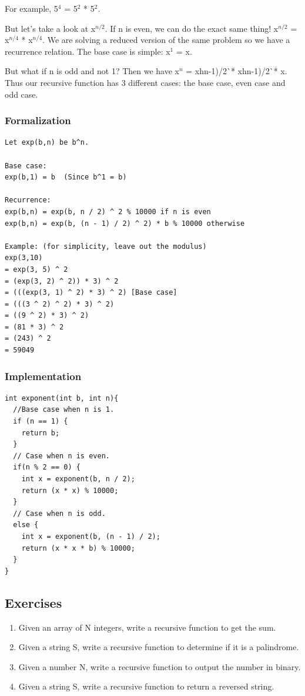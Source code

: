 \documentclass[11pt,oneside]{book}
\begin{document}
For example, 5$^{4}$ = 5$^{2}$ * 5$^{2}$.

But let's take a look at x$^{n/2}$. If n is even, we can do the exact same thing! x$^{n/2}$ = x$^{n/4}$ * x$^{n/4}$. We are solving a reduced version of the same problem so we have a recurrence relation. The base case is simple: x$^{1}$ = x.

But what if n is odd and not 1? Then we have x$^{n}$ = x^^(n-1)/2^^ * x^^(n-1)/2^^ * x. Thus our recursive function has 3 different cases: the base case, even case and odd case.

\subsubsection{Formalization}

\begin{lstlisting}
Let exp(b,n) be b^n.

Base case:
exp(b,1) = b  (Since b^1 = b)

Recurrence:
exp(b,n) = exp(b, n / 2) ^ 2 % 10000 if n is even
exp(b,n) = exp(b, (n - 1) / 2) ^ 2) * b % 10000 otherwise

Example: (for simplicity, leave out the modulus)
exp(3,10)
= exp(3, 5) ^ 2
= (exp(3, 2) ^ 2)) * 3) ^ 2
= (((exp(3, 1) ^ 2) * 3) ^ 2) [Base case]
= (((3 ^ 2) ^ 2) * 3) ^ 2)
= ((9 ^ 2) * 3) ^ 2)
= (81 * 3) ^ 2
= (243) ^ 2
= 59049
\end{lstlisting}

\subsubsection{Implementation}

\begin{lstlisting}
int exponent(int b, int n){
  //Base case when n is 1.
  if (n == 1) {
    return b;
  }
  // Case when n is even.
  if(n % 2 == 0) {
    int x = exponent(b, n / 2);
    return (x * x) % 10000;
  }
  // Case when n is odd.
  else {
    int x = exponent(b, (n - 1) / 2);
    return (x * x * b) % 10000;
  }
}
\end{lstlisting}

\subsection{Exercises}

\begin{enumerate}
\item Given an array of N integers, write a recursive function to get the sum.
\item Given a string S, write a recursive function to determine if it is a palindrome.
\item Given a number N, write a recursive function to output the number in binary.
\item Given a string S, write a recursive function to return a reversed string.
\end{enumerate}
\end{document}
